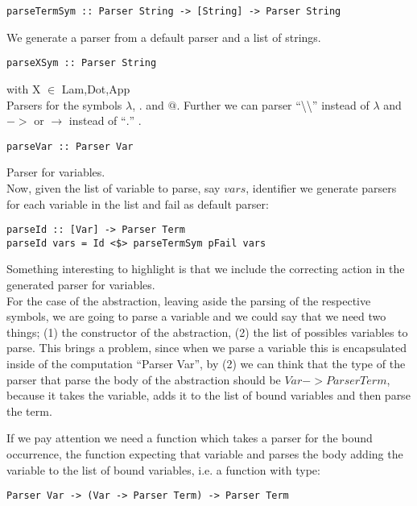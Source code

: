 \documentclass[a4paper,10pt]{article}
\begin{document}
\begin{lstlisting}
parseTermSym :: Parser String -> [String] -> Parser String
\end{lstlisting}
We generate a parser from a default parser and a list of strings.

\begin{lstlisting}
parseXSym :: Parser String
\end{lstlisting} with X $\in$ {Lam,Dot,App}\\
Parsers for the symbols $\lambda$, $.$ and $@$. Further we can
parser ``\textbackslash \textbackslash'' instead of $\lambda$ and $->$ or $\rightarrow$
instead of ``$.$'' .

\begin{lstlisting}
parseVar :: Parser Var
\end{lstlisting} Parser for variables.\\

Now, given the list of variable to parse, say $vars$, identifier
we generate parsers for each variable in the list and fail as default parser:

\begin{lstlisting}
parseId :: [Var] -> Parser Term
parseId vars = Id <$> parseTermSym pFail vars
\end{lstlisting}

Something interesting to highlight is that we include the correcting action in
the generated parser for variables.\\

For the case of the abstraction, leaving aside the parsing of the respective symbols,
we are going to parse a variable and we could say that we need two things;
(1) the constructor of the abstraction, (2) the list of possibles variables to parse.
This brings a problem, since when we parse a variable this is encapsulated inside
of the computation ``Parser Var'', by (2) we can think that the type of the parser
that parse the body of the abstraction should be $Var -> Parser Term$, because it takes the
variable, adds it to the list of bound variables and then parse the term.

If we pay attention we need a function which takes a parser for the bound occurrence,
the function expecting that variable and parses the body adding the variable to the
list of bound variables, i.e. a function with type:

\begin{lstlisting}
Parser Var -> (Var -> Parser Term) -> Parser Term
\end{lstlisting}
\end{document}

